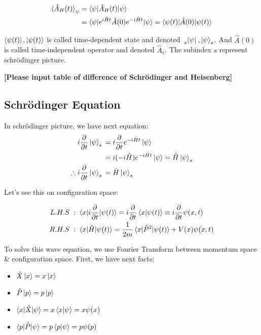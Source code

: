 \documentclass[final]{IEEEphot}
\newcommand{\PD}[2]{\dfrac{\partial #1}{\partial #2}} %
\newcommand{\hX}{\hat{X}}
\newcommand{\hP}{\hat{P}}
\newcommand{\hH}{\hat{H}}
\newcommand{\hA}{\hat{A}}
\newcommand{\TE}[1]{e^{#1 i\hH t}}
\newcommand{\hket}[1][\psi]{\ket{#1}} %
\newcommand{\sket}[1][\psi]{\tensor{\ket{#1}}{_s}}
\newcommand{\VS}{\vspace{0.3cm}} %
\newcommand{\hs}{\hspace{0.1cm}} %
\begin{document}
\begin{equation}
 \begin{split}
  \braket{\hA_H(t)}_\psi &= \braket{\psi|\hA_H(t)|\psi} \\
                         &= \braket{\psi|\TE{}\hA(0)\TE{-}|\psi} = \braket{\psi(t)|\hA(0)|\psi(t)}
 \end{split}
\end{equation}

$\bra{\psi(t)}, \ket{\psi(t)}$ is called time-dependent state and denoted $\tensor[_s]{\bra{\psi}}{}, \tensor{\hket}{_s}$.
And $\hA(0)$ is called time-independent operator and denoted $\hA_s$. The subindex $s$ represent schr\"{o}dinger picture.

\VS

\textbf{[Please input table of difference of Schr\"{o}dinger and Heisenberg]}

\newpage

\subsection{Schr\"{o}dinger Equation}

\VS
\VS

In schr\"{o}dinger picture, we have next equation:
\begin{equation}
\begin{split}
 i \PD{}{t} \sket{} &= i \PD{}{t} \TE{-} \hket \\
                    &= i(-i\hH) \TE{-} \hket = \hH \sket \\
 \therefore i\PD{}{t} \sket{} &=\hH \sket 
\end{split}
\end{equation}

Let's see this on configuration space:

\begin{equation}
\begin{split}
 L.H.S \hs & : \hs \braket{x| i\PD{}{t}|\psi(t)} = i\PD{}{t}\braket{x|\psi(t)} \equiv i\PD{}{t}\psi(x,t)  \\
 R.H.S \hs & : \hs \braket{x| \hH |\psi(t)} = \frac{1}{2m} \braket{x| \hP^2|\psi(t)} + V(x) \psi(x,t)
\end{split}
\end{equation}

To solve this wave equation, we use Fourier Transform between momentum space \& configuration space. First, we have next facts:

\begin{multicols}{2}
  \begin{itemize}
    \item $\hX\ket{x} = x\ket{x}$
    \item $\hP\ket{p} = p\ket{p}$
  \end{itemize}
  
  \begin{itemize}
   \item $\braket{x|\hX|\psi} = x\braket{x|\psi} = x\psi(x)$
   \item $\braket{p|\hP|\psi} = p\braket{p|\psi} = p\psi(p)$
  \end{itemize}
\end{multicols}
\end{document}
